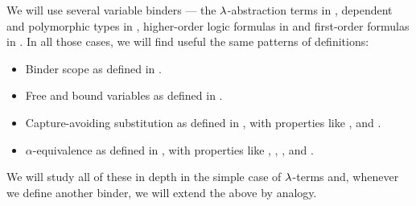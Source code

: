 \begin{remark}\label{rem:variable_binding_properties}
  We will use several variable binders --- the \( {\mathrm \lambda} \)-abstraction terms in , dependent and polymorphic types in , higher-order logic formulas in  and first-order formulas in . In all those cases, we will find useful the same patterns of definitions:
  \begin{itemize}
    \item Binder scope as defined in .
    \item Free and bound variables as defined in .
    \item Capture-avoiding substitution as defined in , with properties like ,  and .
    \item \( \alpha \)-equivalence as defined in , with properties like , , ,  and .
  \end{itemize}

  We will study all of these in depth in the simple case of \( {\mathrm \lambda} \)-terms and, whenever we define another binder, we will extend the above by analogy.
\end{remark}

